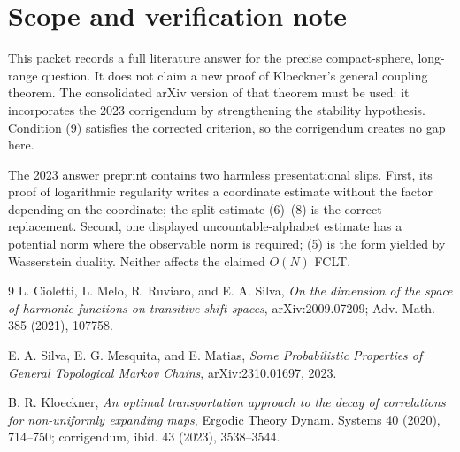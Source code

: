 \documentclass[11pt]{article}
\begin{document}
\section*{Scope and verification note}

This packet records a full literature answer for the precise compact-sphere,
long-range question.  It does not claim a new proof of Kloeckner's general
coupling theorem.  The consolidated arXiv version of that theorem must be used:
it incorporates the 2023 corrigendum by strengthening the stability hypothesis.
Condition (9) satisfies the corrected criterion, so the corrigendum creates no
gap here.

The 2023 answer preprint contains two harmless presentational slips.  First, its
proof of logarithmic regularity writes a coordinate estimate without the factor
depending on the coordinate; the split estimate (6)--(8) is the correct
replacement.  Second, one displayed uncountable-alphabet estimate has a
potential norm where the observable norm is required; (5) is the form yielded by
Wasserstein duality.  Neither affects the claimed \(O(N)\) FCLT.

\begin{thebibliography}{9}
L. Cioletti, L. Melo, R. Ruviaro, and E. A. Silva,
\emph{On the dimension of the space of harmonic functions on transitive shift
spaces},
arXiv:2009.07209; Adv. Math. 385 (2021), 107758.

E. A. Silva, E. G. Mesquita, and E. Matias,
\emph{Some Probabilistic Properties of General Topological Markov Chains},
arXiv:2310.01697, 2023.

B. R. Kloeckner,
\emph{An optimal transportation approach to the decay of correlations for
non-uniformly expanding maps},
Ergodic Theory Dynam. Systems 40 (2020), 714--750; corrigendum, ibid. 43
(2023), 3538--3544.
\end{thebibliography}
\end{document}
